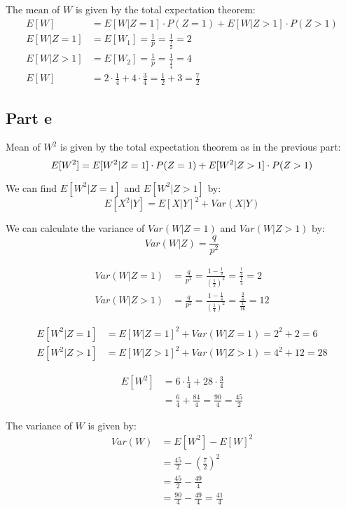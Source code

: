 The mean of $W$ is given by the total expectation theorem:
\begin{align*}
	E[W]     & = E[W|Z=1]\cdot P(Z=1) + E[W|Z>1]\cdot P(Z>1)                           \\
	E[W|Z=1] & = E[W_1] = \frac{1}{p} = \frac{1}{\frac{1}{2}} = 2                      \\
	E[W|Z>1] & = E[W_2] = \frac{1}{p} = \frac{1}{\frac{1}{4}} = 4                      \\
	E[W]     & = 2\cdot\frac{1}{4} + 4\cdot\frac{3}{4} = \frac{1}{2} + 3 = \frac{7}{2}
\end{align*}

\subsection{Part e}

Mean of $W^2$ is given by the total expectation theorem as in the previous part:
\[
	E[W^2] = E[W^2|Z=1]\cdot P(Z=1) + E[W^2|Z>1]\cdot P(Z>1)                           \\
\]

We can find $E[W^2|Z=1]$ and $E[W^2|Z>1]$ by:
\[
	E[X^2|Y] = E[X|Y]^2 + Var(X|Y)
\]

We can calculate the variance of $Var(W|Z=1)$ and $Var(W|Z>1)$ by:
\[
	Var(W|Z) = \frac{q}{p^2}
\]

\begin{align*}
	Var(W|Z=1) & = \frac{q}{p^2} = \frac{1-\frac{1}{2}}{\left(\frac{1}{2}\right)^2} = \frac{\frac{1}{2}}{\frac{1}{4}} = 2   \\
	Var(W|Z>1) & = \frac{q}{p^2} = \frac{1-\frac{1}{4}}{\left(\frac{1}{4}\right)^2} = \frac{\frac{3}{4}}{\frac{1}{16}} = 12
\end{align*}


\begin{align*}
	E[W^2|Z=1] & = E[W|Z=1]^2 + Var(W|Z=1) = 2^2 + 2 = 6   \\
	E[W^2|Z>1] & = E[W|Z>1]^2 + Var(W|Z>1) = 4^2 + 12 = 28
\end{align*}

\begin{align*}
	E[W^2] & = 6\cdot\frac{1}{4} + 28\cdot\frac{3}{4}                   \\
	       & = \frac{6}{4} + \frac{84}{4} = \frac{90}{4} = \frac{45}{2}
\end{align*}

The variance of $W$ is given by:
\begin{align*}
	Var(W) & = E[W^2] - E[W]^2                            \\
	       & = \frac{45}{2} - \left(\frac{7}{2}\right)^2  \\
	       & =  \frac{45}{2} - \frac{49}{4}               \\
	       & = \frac{90}{4} - \frac{49}{4} = \frac{41}{4}
\end{align*}

